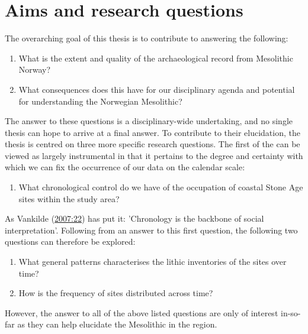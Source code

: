 \documentclass[
  12pt,
  a4paper,
  oneside]{book}
\providecommand{\tightlist}{%
  \setlength{\itemsep}{0pt}\setlength{\parskip}{0pt}}
\begin{document}
\hypertarget{aims-and-research-questions}{%
\section{Aims and research questions}\label{aims-and-research-questions}}

The overarching goal of this thesis is to contribute to answering the following:

\begin{enumerate}
\def\labelenumi{\roman{enumi})}
\tightlist
\item
  What is the extent and quality of the archaeological record from Mesolithic Norway?
\item
  What consequences does this have for our disciplinary agenda and potential for understanding the Norwegian Mesolithic?
\end{enumerate}

The answer to these questions is a disciplinary-wide undertaking, and no single thesis can hope to arrive at a final answer. To contribute to their elucidation, the thesis is centred on three more specific research questions. The first of the can be viewed as largely instrumental in that it pertains to the degree and certainty with which we can fix the occurrence of our data on the calendar scale:

\begin{enumerate}
\def\labelenumi{\arabic{enumi})}
\tightlist
\item
  What chronological control do we have of the occupation of coastal Stone Age sites within the study area?
\end{enumerate}

As Vankilde (\protect\hyperlink{ref-vankilde2007}{2007:22}) has put it: 'Chronology is the backbone of social interpretation'. Following from an answer to this first question, the following two questions can therefore be explored:

\begin{enumerate}
\def\labelenumi{\arabic{enumi})}
\setcounter{enumi}{1}
\tightlist
\item
  What general patterns characterises the lithic inventories of the sites over time?
\item
  How is the frequency of sites distributed across time?
\end{enumerate}

However, the answer to all of the above listed questions are only of interest in-so-far as they can help elucidate the Mesolithic in the region.
\end{document}

